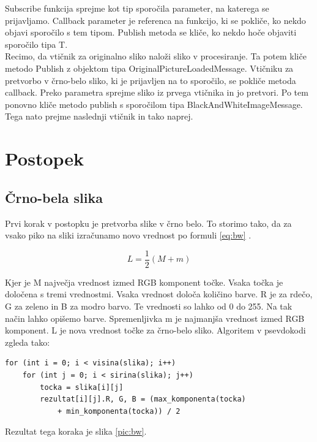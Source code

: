 \documentclass[oneside, a4paper, 12pt]{book}
\begin{document}
Subscribe funkcija sprejme kot tip sporočila parameter, na katerega se prijavljamo. Callback parameter je referenca na funkcijo, ki se pokliče, ko nekdo objavi sporočilo s tem tipom. Publish metoda se kliče, ko nekdo hoče objaviti sporočilo tipa T.\\
Recimo, da vtičnik za originalno sliko naloži sliko v procesiranje. Ta potem kliče metodo Publish z objektom tipa OriginalPictureLoadedMessage. Vtičniku za pretvorbo v črno-belo sliko, ki je prijavljen na to sporočilo, se pokliče metoda callback. Preko parametra sprejme sliko iz prvega vtičnika in jo pretvori. Po tem ponovno kliče metodo publish s sporočilom tipa Black\-And\-White\-Image\-Message. Tega nato prejme naslednji vtičnik in tako naprej.

\section{Postopek}
\subsection{Črno-bela slika}
Prvi korak v postopku je pretvorba slike v črno belo. To storimo tako, da za vsako piko na sliki izračunamo novo vrednost po formuli \ref{eq:bw} \cite{LHS}.

\begin{equation}
L=\dfrac{1}{2}(M+m)
\label{eq:bw}
\end{equation}

Kjer je M največja vrednost izmed RGB \cite{RGB} komponent točke. Vsaka točka je določena s tremi vrednostmi. Vsaka vrednost določa količino barve. R je za rdečo, G za zeleno in B za modro barvo. Te vrednosti so lahko od 0 do 255. Na tak način lahko opišemo barve. Spremenljivka m je najmanjša vrednost izmed RGB komponent. L je nova vrednost točke za črno-belo sliko. Algoritem v psevdokodi zgleda tako:

\begin{verbatim}
for (int i = 0; i < visina(slika); i++)
    for (int j = 0; i < sirina(slika); j++)
	    tocka = slika[i][j]
	    rezultat[i][j].R, G, B = (max_komponenta(tocka) 
	        + min_komponenta(tocka)) / 2
\end{verbatim}


Rezultat tega koraka je slika \ref{pic:bw}.
\end{document}
